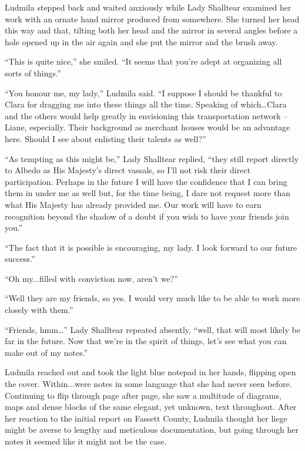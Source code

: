  

Ludmila stepped back and waited anxiously while Lady Shalltear examined her work with an ornate hand mirror produced from somewhere. She turned her head this way and that, tilting both her head and the mirror in several angles before a hole opened up in the air again and she put the mirror and the brush away.

 

“This is quite nice,” she smiled. “It seems that you’re adept at organizing all sorts of things.”

 

“You honour me, my lady,” Ludmila said. “I suppose I should be thankful to Clara for dragging me into these things all the time. Speaking of which…Clara and the others would help greatly in envisioning this transportation network – Liane, especially. Their background as merchant houses would be an advantage here. Should I see about enlisting their talents as well?”

 

“As tempting as this might be,” Lady Shalltear replied, “they still report directly to Albedo as His Majesty’s direct vassals, so I’ll not risk their direct participation. Perhaps in the future I will have the confidence that I can bring them in under me as well but, for the time being, I dare not request more than what His Majesty has already provided me. Our work will have to earn recognition beyond the shadow of a doubt if you wish to have your friends join you.”

 

“The fact that it is possible is encouraging, my lady. I look forward to our future success.”

 

“Oh my...filled with conviction now, aren’t we?”

 

“Well they are my friends, so yes. I would very much like to be able to work more closely with them.”

 

“Friends, hmm…” Lady Shalltear repeated absently, “well, that will most likely be far in the future. Now that we’re in the spirit of things, let’s see what you can make out of my notes.”

 

Ludmila reached out and took the light blue notepad in her hands, flipping open the cover. Within...were notes in some language that she had never seen before. Continuing to flip through page after page, she saw a multitude of diagrams, maps and dense blocks of the same elegant, yet unknown, text throughout. After her reaction to the initial report on Fassett County, Ludmila thought her liege might be averse to lengthy and meticulous documentation, but going through her notes it seemed like it might not be the case.

